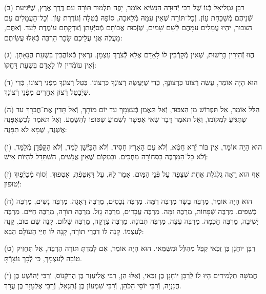 \documentclass[twoside, openany, parskip=half, 11pt]{book}
\begin{document}
(ב) רַבָּן גַּמְלִיאֵל בְּֿנוֹ שֶׁל רַבִּי יְֿהוּדָה הַנָּשִׂיא אוֹמֵר, יָפֶה תַלְמוּד תּוֹרָה עִם דֶּרֶךְ אֶרֶץ, שֶׁיְּֿֿגִיעַת שְֿׁנֵיהֶם מְֿשַׁכַּחַת עָוֹן.
וְֿכׇל־תּוֹרָה שֶׁאֵין עִמָּהּ מְֿלָאכָה, סוֹפָהּ בְּֿטֵלָה וְֿגוֹרֶרֶת עָוֹן. וְֿכׇל־הָעֲמֵלִים עִם הַצִּבּוּר, יִהְיוּ עֲמֵלִים עִמָּהֶם לְֿשֵׁם שָׁמַיִם, שֶׁזְּֿכוּת אֲבוֹתָם מְֿסַיְּֿֿעָתַן וְֿצִדְקָתָם עוֹמֶדֶת לָעַד. וְֿאַתֶּם, מַעֲלֶה אֲנִי עֲלֵיכֶם שָׂכָר הַרְבֵּה כְּֿאִלּוּ עֲשִׂיתֶם:

(ג) הֱווּ זְֿהִירִין בָּרָשׁוּת, שֶׁאֵין מְֿקָרְֿבִין לוֹ לָאָדָם אֶלָּא לְֿצֹרֶךְ עַצְמָן. נִרְאִין כְּֿאוֹהֲבִין בִּשְׁעַת הֲנָאָתָן. וְֿאֵין עוֹמְֿדִין לוֹ לָאָדָם בִּשְׁעַת דָּחֳקוֹ:

(ד) הוּא הָיָה אוֹמֵר, עֲשֵׂה רְֿצוֹנוֹ כִּרְצוֹנֶךָ, כְּֿדֵי שֶׁיַּעֲשֶׂה רְֿצוֹנְֿךָ כִּרְצוֹנוֹ. בַּטֵּל רְֿצוֹנְֿךָ מִפְּֿנֵי רְֿצוֹנוֹ, כְּֿדֵי שֶׁיְּֿֿבַטֵּל רְֿצוֹן אֲחֵרִים מִפְּֿנֵי רְֿצוֹנֶךָ.

(ה) הִלֵּל אוֹמֵר, אַל תִּפְרוֹשׁ מִן הַצִּבּוּר, וְֿאַל תַּאֲמֵן בְּֿעַצְמָךְ עַד יוֹם מוֹתָךְ, וְֿאַל תָּדִין אֶת־חֲבֵרָךְ עַד שֶׁתַּגִּיעַ לִמְקוֹמוֹ, וְֿאַל תֹּאמַר דָּבָר שֶׁאִי אֶפְשָׁר לִשְׁמוֹעַ שֶׁסּוֹפוֹ לְֿהִשָּׁמַע. וְֿאַל תֹּאמַר לִכְשֶׁאֶפָּנֶה אֶשְׁנֶה, שֶׁמָּא לֹא תִפָּנֶה:

(ו) הוּא הָיָה אוֹמֵר, אֵין בּוֹר יְֿרֵא חֵטְֿא, וְֿלֹא עַם הָאָרֶץ חָסִיד, וְֿלֹא הַבַּיְּֿֿשָׁן לָמֵד, וְֿלֹא הַקַּפְּֿדָן מְֿלַמֵּד, וְֿלֹא כׇל־הַמַּרְבֶּה בִסְחוֹרָה מַחְכִּים. ובִמְקוֹם שֶׁאֵין אֲנָשִׁים, הִשְׁתַּדֵּל לִהְיוֹת אִישׁ:

(ז) אַף הוּא רָאָה גֻלְגֹּלֶת אַחַת שֶׁצָּפָה עַל פְּֿנֵי הַמָּיִם. אָמַר לָהּ, עַל דַּאֲטֵּפְֿתְּ, אַטְפוּךְ. וְֿסוֹף מְֿטַיְּֿֿפַיִךְ יְֿטוּפוּן:

(ח) הוּא הָיָה אוֹמֵר,
מַרְבֶּה בָשָׂר מַרְבֶּה רִמָּה.
מַרְבֶּה נְֿכָסִים, מַרְבֶּה דְֿאָגָה.
מַרְבֶּה נָשִׁים, מַרְבֶּה כְֿשָׁפִים.
מַרְבֶּה שְֿׁפָחוֹת, מַרְבֶּה זִמָּה.
מַרְבֶּה עֲבָדִים, מַרְבֶּה גָזֵל.
מַרְבֶּה תוֹרָה, מַרְבֶּה חַיִּים.
מַרְבֶּה יְֿשִׁיבָה, מַרְבֶּה חׇכְמָה.
מַרְבֶּה עֵצָה, מַרְבֶּה תְֿבוּנָה.
מַרְבֶּה צְֿדָקָה, מַרְבֶּה שָׁלוֹם.
קָנָה שֵׁם טוֹב, קָנָה לְֿעַצְמוֹ. קָנָה לוֹ דִבְרֵי תוֹרָה, קָנָה לוֹ חַיֵּי הָעוֹלָם הַבָּא:

(ט) רַבָּן יוֹחָנָן בֶּן זַכַּאי קִבֵּל מֵהִלֵּל וּמִשַּׁמַּאי. הוּא הָיָה אוֹמֵר, אִם לָמַדְתָּ תּוֹרָה הַרְבֵּה, אַל תַּחֲזִיק טוֹבָה לְֿעַצְמָךְ, כִּי לְֿכָךְ נוֹצָרְֿתָּ.

(י)
חֲמִשָּׁה תַלְמִידִים הָיוּ לוֹ לְֿרַבָּן יוֹחָנָן בֶּן זַכַּאי, וְֿאֵלּוּ הֵן,
רַבִּי אֱלִיעֶזֶר בֶּן הֻרְקְֿנוֹס,
וְֿרַבִּי יְֿהוֹשֻׁעַ בֶּן חֲנַנְיָה,
וְֿרַבִּי יוֹסֵי הַכֹּהֵן,
וְֿרַבִּי שִׁמְעוֹן בֶּן נְֿתַנְאֵל,
וְֿרַבִּי אֶלְעָזָר בֶּן עֲרָךְ.
\end{document}
